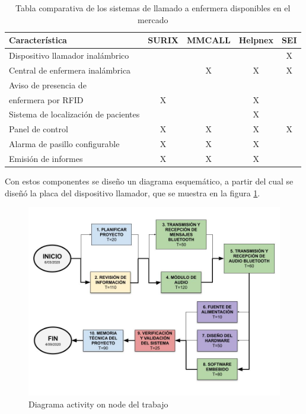 \begin{table}[h]
	\centering
	\caption[Sistemas de llamado a enfermera]{Tabla comparativa de los sistemas de llamado a enfermera disponibles en el mercado}
	\begin{tabular}{l c c c c}    
		\toprule
		\textbf{Característica} 	 & \textbf{SURIX} & \textbf{MMCALL} & \textbf{Helpnex} & \textbf{SEI}\\
		\midrule
		Dispositivo llamador inalámbrico 				&  	&  	&  	& X \\
		Central de enfermera inalámbrica 				&  	& X & X & X \\
		Aviso de presencia de\\enfermera por RFID 		& X	&  	& X	&   \\
		Sistema de localización de pacientes 			&  	&  	& X	&   \\
		Panel de control 								& X	& X	& X	& X \\
		Alarma de pasillo configurable	 				& X	& X	& X	&   \\
		Emisión de informes				 				& X	& X	& X	&   \\
		\bottomrule
		\hline
	\end{tabular}
	\label{tab:caracteristicasMic}
\end{table}

Con estos componentes se diseño un diagrama esquemático, a partir del cual se diseñó la placa del dispositivo llamador, que se muestra en la figura \ref{fig:esquematico}.

\begin{figure}[htpb]
	\centering
	\includegraphics[scale=0.4]{./Figures/ActivityOnNode.jpg}
	\caption{Diagrama activity on node del trabajo}
	\label{fig:esquematico}
\end{figure}

